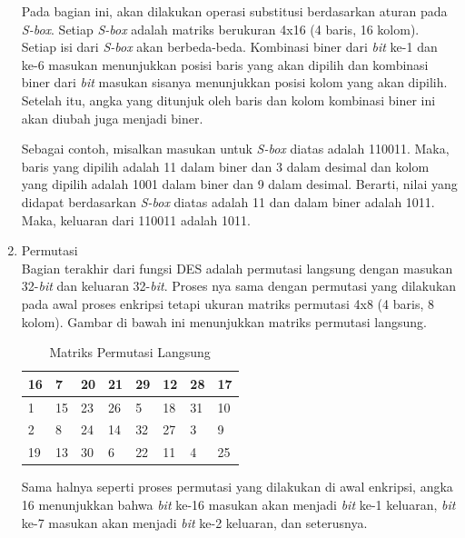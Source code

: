 \begin{enumerate}
Pada bagian ini, akan dilakukan operasi substitusi berdasarkan aturan pada \textit{S-box}. Setiap \textit{S-box} adalah matriks berukuran 4x16 (4 baris, 16 kolom). Setiap isi dari \textit{S-box} akan berbeda-beda. Kombinasi biner dari \textit{bit} ke-1 dan ke-6 masukan menunjukkan posisi baris yang akan dipilih dan kombinasi biner dari \textit{bit} masukan sisanya menunjukkan posisi kolom yang akan dipilih. Setelah itu, angka yang ditunjuk oleh baris dan kolom kombinasi biner ini akan diubah juga menjadi biner.

	Sebagai contoh, misalkan masukan untuk \textit{S-box} diatas adalah 110011. Maka, baris yang dipilih adalah 11 dalam biner dan 3 dalam desimal dan kolom yang dipilih adalah 1001 dalam biner dan 9 dalam desimal. Berarti, nilai yang didapat berdasarkan \textit{S-box} diatas adalah 11 dan dalam biner adalah 1011. Maka, keluaran dari 110011 adalah 1011.

	\item Permutasi\\
Bagian terakhir dari fungsi DES adalah permutasi langsung dengan masukan 32-\textit{bit} dan keluaran 32-\textit{bit}. Proses nya sama dengan permutasi yang dilakukan pada awal proses enkripsi tetapi ukuran matriks permutasi 4x8 (4 baris, 8 kolom). Gambar di bawah ini menunjukkan matriks permutasi langsung.

\begin{table}
	\begin{center}
		\begin{tabular}{|l|l|l|l|l|l|l|l|}
				\hline
			16	&	7	&	20	&	21	&	29	&	12	&	28	&	17	\\ \hline
			1	&	15	&	23	&	26	&	5	&	18	&	31	&	10		\\ \hline
			2	&	8	&	24	&	14	&	32	&	27	&	3	&	9				\\ \hline
			19	&	13	&	30	&	6	&	22	&	11	&	4	&	25	\\ \hline
		\end{tabular}
	\end{center}
	\caption{Matriks Permutasi Langsung}\label{table:permutasi_langsung}
\end{table}


Sama halnya seperti proses permutasi yang dilakukan di awal enkripsi, angka 16 menunjukkan bahwa \textit{bit} ke-16 masukan akan menjadi \textit{bit} ke-1 keluaran, \textit{bit} ke-7 masukan akan menjadi \textit{bit} ke-2 keluaran, dan seterusnya.
\end{enumerate}

